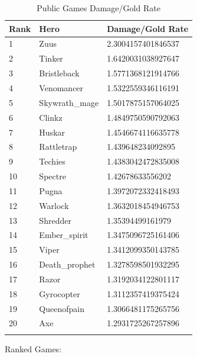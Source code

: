 \documentclass{article}
\begin{document}
\begin{longtable}{|p{2.5cm}|p{2.5cm}|p{5.5cm}|}

\hline
\textbf{Rank} & \textbf{Hero} & \textbf{Damage/Gold Rate} \\
\hline
\endhead

1 & Zuus & 2.3004157401846537 \\\hline
2 & Tinker & 1.6420031038927647 \\\hline
3 & Bristleback & 1.5771368121914766 \\\hline
4 & Venomancer & 1.5322559346116191 \\\hline
5 & Skywrath\_mage & 1.5017875157064025 \\\hline
6 & Clinkz & 1.4849750590792063 \\\hline
7 & Huskar & 1.4546674116635778 \\\hline
8 & Rattletrap & 1.439648234092895 \\\hline
9 & Techies & 1.4383042472835008 \\\hline
10 & Spectre & 1.42678633556202 \\\hline
11 & Pugna & 1.3972072332418493 \\\hline
12 & Warlock & 1.3632018454946753 \\\hline
13 & Shredder & 1.35394499161979 \\\hline
14 & Ember\_spirit & 1.3475096725161406 \\\hline
15 & Viper & 1.3412099350143785 \\\hline
16 & Death\_prophet & 1.3278598501932295 \\\hline
17 & Razor & 1.3192034122801117 \\\hline
18 & Gyrocopter & 1.3112357419375424 \\\hline
19 & Queenofpain & 1.3066481175265756 \\\hline
20 & Axe & 1.2931725267257896 \\\hline


\caption{Public Games Damage/Gold Rate}
\label{public-games-damage-gold-rate}
\end{longtable}

Ranked Games:
\end{document}
